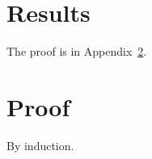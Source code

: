 \documentclass{article}
\begin{document}
\section{Results}
The proof is in Appendix~\ref{app:proof}.
\appendix
\section{Proof}\label{app:proof}
By induction.
\end{document}
